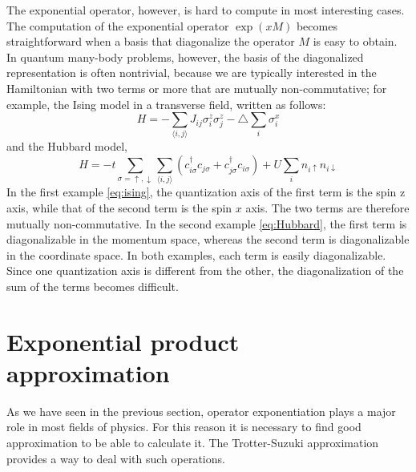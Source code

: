 The exponential operator, however, is hard to compute in most interesting cases. The computation of the exponential operator $\exp{(xM)}$ becomes straightforward when a basis that diagonalize the operator $M$ is easy to obtain. In quantum many-body problems, however, the basis of the diagonalized representation is often nontrivial, because we are typically interested in the Hamiltonian with two terms or more that are mutually non-commutative; for example, the Ising model in a transverse field, written as follows:
\begin{equation} \label{eq:ising}
H = -\sum_{\langle i,j \rangle} J_{ij} \sigma_i^z \sigma_j^z - \triangle\sum_i \sigma_i^x
\end{equation}
and the Hubbard model,
\begin{equation} \label{eq:Hubbard}
H = -t \sum_{\sigma = \uparrow ,\downarrow} \sum_{\langle i,j \rangle} (c_{i\sigma}^\dagger c_{j\sigma} + c_{j\sigma}^\dagger c_{i\sigma}) + U\sum_i n_{i\uparrow} n_{i\downarrow}
\end{equation}
In the first example \eqref{eq:ising}, the quantization axis of the first term is the spin z axis, while that of the second term is the spin $x$ axis. The two terms are therefore mutually non-commutative. In the second example \eqref{eq:Hubbard}, the first term is diagonalizable in the momentum space, whereas the second term is diagonalizable in the coordinate space. In both examples, each term is easily diagonalizable. Since one quantization axis is different from the other, the diagonalization of the sum of the terms becomes difficult.

\section{Exponential product approximation}
As we have seen in the previous section, operator exponentiation plays a major role in most fields of physics. For this reason it is necessary to find good approximation to be able to calculate it. The Trotter-Suzuki approximation provides a way to deal with such operations. 

